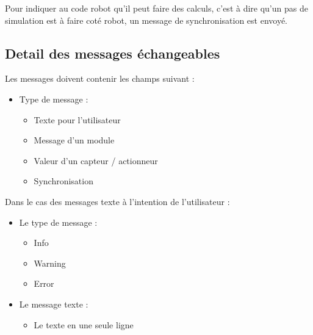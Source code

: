 Pour indiquer au code robot qu'il peut faire des calculs, c'est à dire
qu'un pas de simulation est à faire coté robot, un message de
synchronisation est envoyé.


\subsection{Detail des messages échangeables}
Les messages doivent contenir les champs suivant :
\begin{itemize}
    \item{Type de message :}
    \begin{itemize}
        \item{Texte pour l'utilisateur}
        \item{Message d'un module}
        \item{Valeur d'un capteur / actionneur}
        \item{Synchronisation}
    \end{itemize}
\end{itemize}

Dans le cas des messages texte à l'intention de l'utilisateur :
\begin{itemize}
    \item{Le type de message :}
    \begin{itemize}
        \item{Info}
        \item{Warning}
        \item{Error}
    \end{itemize}
    \item{Le message texte :}
    \begin{itemize}
        \item{Le texte en une seule ligne}
    \end{itemize}
\end{itemize}

